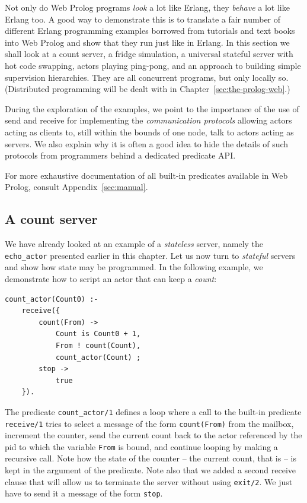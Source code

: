 \noindent Not only do Web Prolog programs \textit{look} a lot like Erlang, they \textit{behave} a lot like Erlang too. A good way to demonstrate this is to translate a fair number of different Erlang programming examples borrowed from tutorials and text books into Web Prolog and show that they run just like in Erlang. In this section we shall look at a count server, a fridge simulation, a universal stateful server with hot code swapping, actors playing ping-pong, and an approach to building simple supervision hierarchies. They are all concurrent programs, but only locally so. (Distributed programming will be dealt with in Chapter~\ref{sec:the-prolog-web}.)

During the exploration of the examples, we point to the importance of the use of send and receive for implementing the \textit{communication protocols} allowing actors acting as clients to, still within the bounds of one node, talk to actors acting as servers. We also explain why it is often a good idea to hide the details of such protocols from programmers behind a dedicated predicate API.

For more exhaustive documentation of all built-in predicates available in Web Prolog, consult Appendix~\ref{sec:manual}.

\subsection{A count server}\label{sec:servers}

We have already looked at an example of a \textit{stateless} server, namely the \texttt{echo\_actor} presented earlier in this chapter. Let us now turn to \textit{stateful} servers and show how state may be programmed. In the following example, we demonstrate how to script an actor that can keep a \textit{count}:

\begin{verbatim}
count_actor(Count0) :-                            
    receive({                         
        count(From) ->
            Count is Count0 + 1,              
            From ! count(Count),              
            count_actor(Count) ;
        stop ->
            true
    }).                            
\end{verbatim}

\noindent The predicate \texttt{count\_actor/1} defines a loop where a call to the built-in predicate \texttt{receive/1} tries to select a message of the form \texttt{count(From)} from the mailbox, increment the counter, send the current count back to the actor referenced by the pid to which the variable \texttt{From} is bound, and continue looping by making a recursive call. Note how the state of the counter -- the current count, that is -- is kept in the argument of the predicate. Note also that we added a second receive clause that will allow us to terminate the server without using \texttt{exit/2}. We just have to send it a message of the form \texttt{stop}. 


